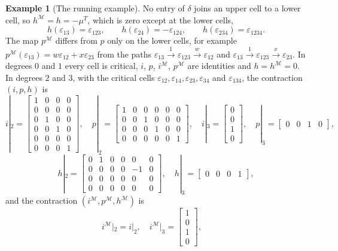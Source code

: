 \documentclass[12pt]{amsart}
\theoremstyle{plain}
\theoremstyle{definition}
\newtheorem{example}[theorem]{Example}
\newcommand{\M}{\mathcal{M}}
\newcommand{\eps}{\varepsilon}
\begin{document}
\begin{example}[The running example]
No entry of $\delta$ joins an upper cell to a lower cell, so $h^{\M} = h = -\mu^{T}$, which is zero except at the lower cells,
\[
    h(\eps_{13}) = \eps_{123}, \qquad h(\eps_{24}) = -\eps_{124}, \qquad h(\eps_{234}) = \eps_{1234} .
\]
The map $p^{\M}$ differs from $p$ only on the lower cells, for example $p^{\M}(\eps_{13}) = w \eps_{12} + x \eps_{23}$ from the paths ${\eps_{13} \xrightarrow{1} \eps_{123} \xrightarrow{w} \eps_{12}}$ and ${\eps_{13} \xrightarrow{1} \eps_{123} \xrightarrow{x} \eps_{23}}$. In degrees $0$ and $1$ every cell is critical, $i$, $p$, $i^{\M}$, $p^{\M}$ are identities and $h = h^{\M} = 0$. In degrees $2$ and $3$, with the critical cells $\eps_{12}, \eps_{14}, \eps_{23}, \eps_{34}$ and $\eps_{134}$, the contraction $(i, p, h)$ is
\[
    i|_2 = \begin{bmatrix} 1 & 0 & 0 & 0\\ 0 & 0 & 0 & 0\\ 0 & 1 & 0 & 0\\ 0 & 0 & 1 & 0\\ 0 & 0 & 0 & 0\\ 0 & 0 & 0 & 1 \end{bmatrix}, \quad
    p|_2 = \begin{bmatrix} 1 & 0 & 0 & 0 & 0 & 0\\ 0 & 0 & 1 & 0 & 0 & 0\\ 0 & 0 & 0 & 1 & 0 & 0\\ 0 & 0 & 0 & 0 & 0 & 1 \end{bmatrix}, \quad
    i|_3 = \begin{bmatrix} 0\\ 0\\ 1\\ 0 \end{bmatrix}, \quad
    p|_3 = \begin{bmatrix} 0 & 0 & 1 & 0 \end{bmatrix},
\]
\[
    h|_2 = \begin{bmatrix} 0 & 1 & 0 & 0 & 0 & 0\\ 0 & 0 & 0 & 0 & -1 & 0\\ 0 & 0 & 0 & 0 & 0 & 0\\ 0 & 0 & 0 & 0 & 0 & 0 \end{bmatrix}, \quad
    h|_3 = \begin{bmatrix} 0 & 0 & 0 & 1 \end{bmatrix},
\]
and the contraction $(i^{\M}, p^{\M}, h^{\M})$ is
\[
    i^{\M}|_2 = i|_2, \quad
    i^{\M}|_3 = \begin{bmatrix} 1\\ 0\\ 1\\ 0 \end{bmatrix}, \quad
\]
\end{example}
\end{document}
